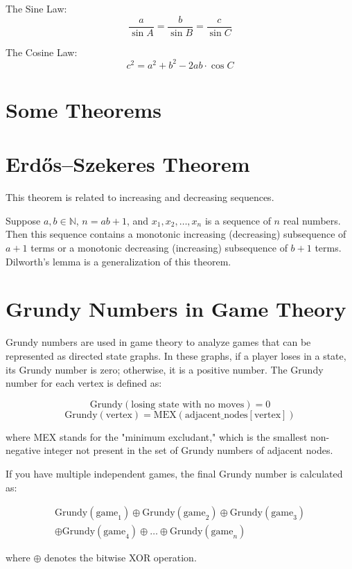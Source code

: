 \documentclass[a4paper,landscape]{article} %
\begin{document}
\begin{multicols}{3}
The Sine Law:
\[
\frac{a}{\sin A} = \frac{b}{\sin B} = \frac{c}{\sin C}
\]

The Cosine Law:
\[
c^2 = a^2 + b^2 - 2ab \cdot \cos C
\]

\section*{Some Theorems}
\section*{Erdős–Szekeres Theorem}
This theorem is related to increasing and decreasing sequences.

Suppose \( a, b \in \mathbb{N} \), \( n = ab + 1 \), and \( x_1, x_2, \dots, x_n \) is a sequence of \( n \) real numbers. Then this sequence contains a monotonic increasing (decreasing) subsequence of \( a + 1 \) terms or a monotonic decreasing (increasing) subsequence of \( b + 1 \) terms. Dilworth's lemma is a generalization of this theorem.

\section*{Grundy Numbers in Game Theory}
Grundy numbers are used in game theory to analyze games that can be represented as directed state graphs. In these graphs, if a player loses in a state, its Grundy number is zero; otherwise, it is a positive number. The Grundy number for each vertex is defined as:

\[
\text{Grundy}(\text{losing state with no moves}) = 0
\]
\[
\text{Grundy}(\text{vertex}) = \text{MEX}(\text{adjacent\_nodes}[\text{vertex}])
\]

where MEX stands for the "minimum excludant," which is the smallest non-negative integer not present in the set of Grundy numbers of adjacent nodes.

If you have multiple independent games, the final Grundy number is calculated as:


\begin{multline*}
\text{Grundy}(\text{game}_1) \oplus \text{Grundy}(\text{game}_2) \oplus \text{Grundy}(\text{game}_3) \\
\oplus \text{Grundy}(\text{game}_4) \oplus \dots \oplus \text{Grundy}(\text{game}_n)
\end{multline*}

where \( \oplus \) denotes the bitwise XOR operation.

\end{multicols}
\end{document}

